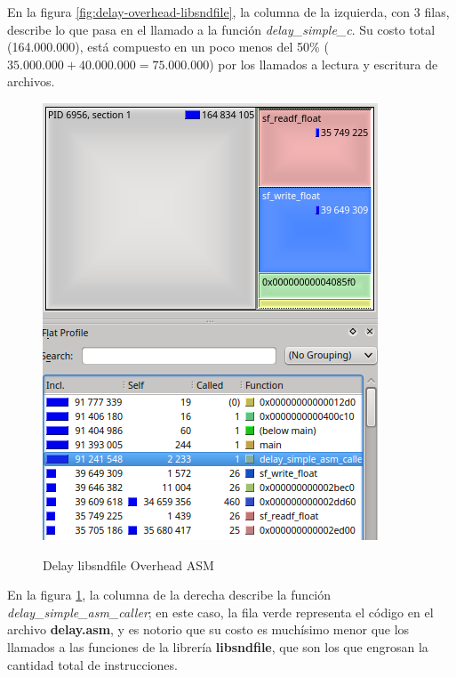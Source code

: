En la figura \ref{fig:delay-overhead-libsndfile}, la columna de la izquierda, con 3 filas, describe lo que pasa en el llamado a la función \textit{delay\_simple\_c}. Su costo total (164.000.000), está compuesto en un poco menos del 50\% ($35.000.000+40.000.000 = 75.000.000$) por los llamados a lectura y escritura de archivos.

\begin{figure}[H]
    \centering
    \includegraphics[scale=0.7]{imagenes/delay-overhead-libsndfile-asm.png}
    \label{fig:delay-overhead-libsndfile-asm}
    \caption{Delay libsndfile Overhead ASM}
\end{figure}

En la figura \ref{fig:delay-overhead-libsndfile-asm}, la columna de la derecha describe la función \textit{delay\_simple\_asm\_caller}; en este caso, la fila verde representa el código en el archivo \textbf{delay.asm}, y es notorio que su costo es muchísimo menor que los llamados a las funciones de la librería \textbf{libsndfile}, que son los que engrosan la cantidad total de instrucciones. 

